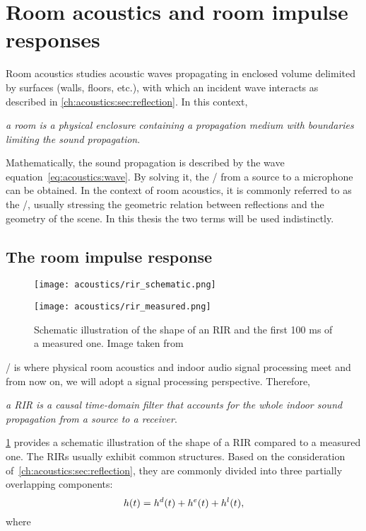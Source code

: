 \section{Room acoustics and room impulse responses}\label{ch:acoustics:sec:rir}
Room acoustics studies acoustic waves propagating in enclosed volume delimited by surfaces (walls, floors, etc.), with which an incident wave interacts as described in \cref{ch:acoustics:sec:reflection}.
In this context,\begin{center}
    \textit{a \textit{room} is a physical enclosure containing a propagation medium with boundaries limiting the sound propagation}.
\end{center}%
Mathematically, the sound propagation is described by the wave equation~\eqref{eq:acoustics:wave}.
By solving it, the \AIRdef/
from a source to a microphone can be obtained.
In the context of room acoustics, it is commonly referred to as the \RIRdef/, usually stressing
the geometric relation between reflections and the geometry of the scene.
In this thesis the two terms will be used indistinctly.

\subsection{The room impulse response}\label{ch:acoustics:subsec:rir}
\begin{figure}[t]
    \begin{fullwidth}

        \begin{minipage}[b]{.5\textwidth}
            \centering
            \texttt{[image: acoustics/rir\_schematic.png]}
        \end{minipage}%
        \begin{minipage}[b]{.5\textwidth}
        \centering
        \texttt{[image: acoustics/rir\_measured.png]}
    \end{minipage}
    \caption{Schematic illustration of the shape of an \ac{RIR} and the first 100 ms of a measured one. Image taken from~}
    \label{fig:acoustics:rir}
    \end{fullwidth}
\end{figure}
\RIRdef/ is where physical room acoustics and indoor audio signal processing meet and from now on, we will adopt a signal processing perspective.
Therefore,
\begin{center}
\textit{a \ac{RIR} is a causal time-domain filter that accounts for the whole indoor sound propagation from a source to a receiver}.
\end{center}
\cref{fig:acoustics:rir} provides a schematic illustration of the shape of a \ac{RIR} compared to a measured one.
The \acp{RIR} usually exhibit common structures.
Based on the consideration of~\cref{ch:acoustics:sec:reflection}, they are commonly divided into three partially overlapping components:
\begin{equation}\label{eq:acoustics:rir_full}
h(t) = h^d(t) + h^e(t) + h^l(t)
,
\end{equation}
where

